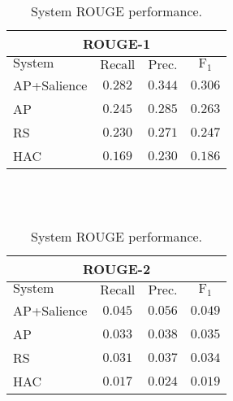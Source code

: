 \begin{table}[h]
\centering
\begin{tabular}{l c c c}
\multicolumn{4}{c}{ROUGE-1}\\
\hline
\hline
$\mathrm{System}$ & $\mathrm{Recall}$ & $\mathrm{Prec.}$ & $\mathrm{F}_1$\\
[0.5ex]
\hline
AP+Salience & $\mathbf{0.282}$ & $\mathbf{0.344}$ & $\mathbf{0.306}$ \\
AP          & $0.245$ & $0.285$ & $0.263$ \\
RS          & $0.230$ & $0.271$ & $0.247$ \\
HAC         & $0.169$ & $0.230$ & $0.186$ \\
\hline %
\end{tabular}
~\\[1ex]
~\\
\begin{tabular}{l c c c}
\multicolumn{4}{c}{ROUGE-2}\\
\hline
\hline
$\mathrm{System}$ & $\mathrm{Recall}$ & $\mathrm{Prec.}$ & $\mathrm{F}_1$\\[0.5ex]
\hline
AP+Salience & $\mathbf{0.045}$ & $\mathbf{0.056}$ & $\mathbf{0.049}$ \\
AP          & $0.033$ & $0.038$ & $0.035$ \\
RS          & $0.031$ & $0.037$ & $0.034$ \\
HAC         & $0.017$ & $0.024$ & $0.019$ \\
\hline %
\end{tabular}
%
%
\caption{System ROUGE performance.} %
\label{tab:rouge}
\end{table}




